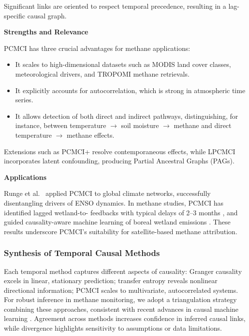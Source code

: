 Significant links are oriented to respect temporal precedence, resulting in a lag-specific causal graph.

\textbf{Strengths and Relevance}

PCMCI has three crucial advantages for methane applications:

\begin{itemize}
\item It scales to high-dimensional datasets such as MODIS land cover classes, meteorological drivers, and TROPOMI methane retrievals.
\item It explicitly accounts for autocorrelation, which is strong in atmospheric time series.
\item It allows detection of both direct and indirect pathways, distinguishing, for instance, between temperature $\rightarrow$ soil moisture $\rightarrow$ methane and direct temperature $\rightarrow$ methane effects.
\end{itemize}

Extensions such as PCMCI+ resolve contemporaneous effects, while LPCMCI incorporates latent confounding, producing Partial Ancestral Graphs (PAGs).

\textbf{Applications}

Runge et al.~\cite{Runge2019_2} applied PCMCI to global climate networks, successfully disentangling drivers of ENSO dynamics. In methane studies, PCMCI has identified lagged wetland-to- feedbacks with typical delays of 2–3 months \cite{Krich2020}, and guided causality-aware machine learning of boreal wetland emissions \cite{Knox2024}. These results underscore PCMCI’s suitability for satellite-based methane attribution.

\subsubsection{Synthesis of Temporal Causal Methods}

Each temporal method captures different aspects of causality: Granger causality excels in linear, stationary prediction; transfer entropy reveals nonlinear directional information; PCMCI scales to multivariate, autocorrelated systems. For robust inference in methane monitoring, we adopt a triangulation strategy combining these approaches, consistent with recent advances in causal machine learning \cite{Kaddour2022}. Agreement across methods increases confidence in inferred causal links, while divergence highlights sensitivity to assumptions or data limitations.


